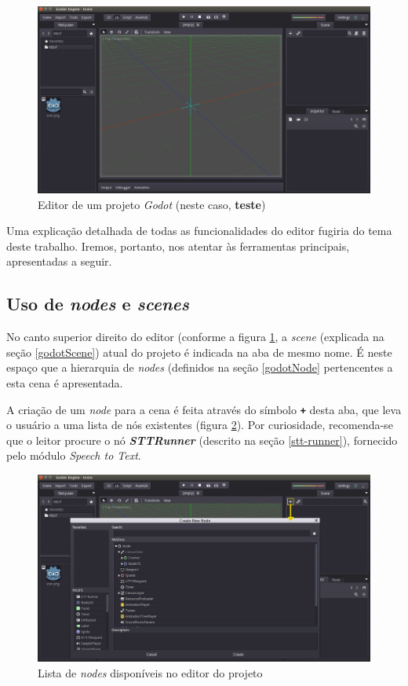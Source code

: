 \begin{figure}[H]
  \centering
  \includegraphics[width=.9\textwidth]{image/in-game-editor}
  \caption{Editor de um projeto \textit{Godot} (neste caso, \textbf{teste})}
  \label{in-game-editor}
\end{figure}

Uma explicação detalhada de todas as funcionalidades do editor fugiria do tema deste trabalho. Iremos, portanto, nos atentar às ferramentas principais, apresentadas a seguir.


\subsection{Uso de \textit{nodes} e \textit{scenes}}

No canto superior direito do editor (conforme a figura \ref{in-game-editor}, a \textit{scene} (explicada na seção \ref{godotScene}) atual do projeto é indicada na aba de mesmo nome. É neste espaço que a hierarquia de \textit{nodes} (definidos na seção \ref{godotNode} pertencentes a esta cena é apresentada.

A criação de um \textit{node} para a cena é feita através do símbolo \textbf{\texttt{+}} desta aba, que leva o usuário a uma lista de nós existentes (figura \ref{editor-node}). Por curiosidade, recomenda-se que o leitor procure o nó \textbf{\textit{STTRunner}} (descrito na seção \ref{stt-runner}), fornecido pelo módulo \textit{Speech to Text}.

\begin{figure}[H]
  \centering
  \includegraphics[width=.9\textwidth]{image/editor-node-edit}
  \caption{Lista de \textit{nodes} disponíveis no editor do projeto}
  \label{editor-node}
\end{figure}


